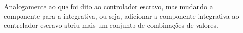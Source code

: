 Analogamente ao que foi dito ao controlador escravo, mas mudando a componente para a integrativa, ou seja, adicionar a componente
integrativa ao controlador escravo abriu mais um conjunto de combinações de valores.